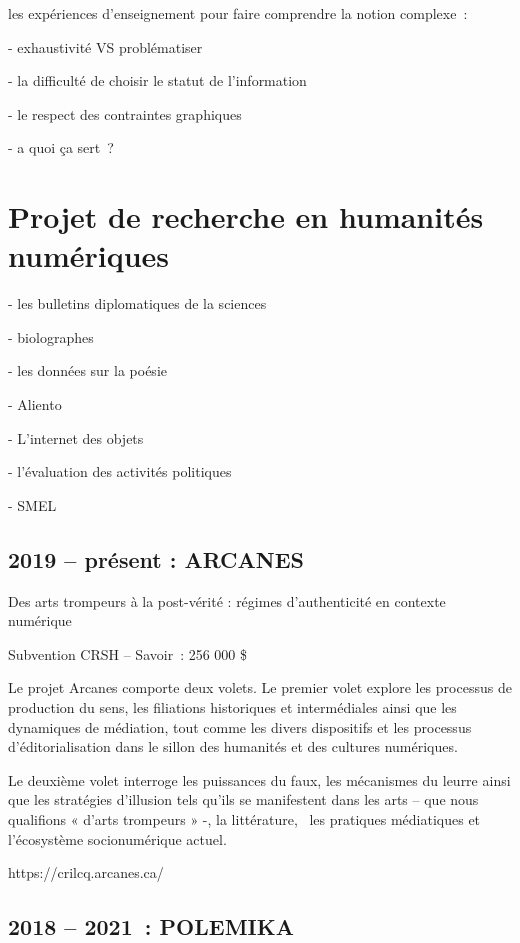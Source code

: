 \documentclass[
  letterpaper,
  DIV=11,
  numbers=noendperiod]{scrreprt}
\begin{document}
les expériences d'enseignement pour faire comprendre la notion
complexe~:

- exhaustivité VS problématiser

- la difficulté de choisir le statut de l'information

- le respect des contraintes graphiques

- a quoi ça sert~?

\hypertarget{sec-projetsRecherche}{%
\section{Projet de recherche en humanités
numériques}\label{sec-projetsRecherche}}

- les bulletins diplomatiques de la sciences

- biolographes

- les données sur la poésie

- Aliento

- L'internet des objets

- l'évaluation des activités politiques

- SMEL

\hypertarget{sec-projetArcanes}{%
\subsection{2019 -- présent : ARCANES}\label{sec-projetArcanes}}

Des arts trompeurs à la post-vérité : régimes d'authenticité en contexte
numérique

Subvention CRSH -- Savoir~: 256 000 \$

Le projet Arcanes comporte deux volets. Le premier volet explore les
processus de production du sens, les filiations historiques et
intermédiales ainsi que les dynamiques de médiation, tout comme les
divers dispositifs et les processus d'éditorialisation dans le sillon
des humanités et des cultures numériques.

Le deuxième volet interroge les puissances du faux, les mécanismes du
leurre ainsi que les stratégies d'illusion tels qu'ils se manifestent
dans les arts -- que nous qualifions « d'arts trompeurs » -, la
littérature,~ les pratiques médiatiques et l'écosystème socionumérique
actuel.

https://crilcq.arcanes.ca/~

\hypertarget{sec-projetPolemika}{%
\subsection{2018 -- 2021~: POLEMIKA}\label{sec-projetPolemika}}
\end{document}
